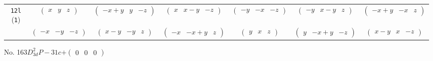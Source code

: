 \documentclass[fleqn,9pt,landscape]{jsarticle}
\begin{document}
\begin{center}
\begin{longtable}{ccccccc}
{\tt 12l} ({\tt 1}) & $ \begin{pmatrix} x & y & z \end{pmatrix} $ & $ \begin{pmatrix} - x + y & y & - z \end{pmatrix} $ & $ \begin{pmatrix} x & x - y & - z \end{pmatrix} $ & $ \begin{pmatrix} - y & - x & - z \end{pmatrix} $ & $ \begin{pmatrix} - y & x - y & z \end{pmatrix} $ & $ \begin{pmatrix} - x + y & - x & z \end{pmatrix} $ \\
& $ \begin{pmatrix} - x & - y & - z \end{pmatrix} $ & $ \begin{pmatrix} x - y & - y & z \end{pmatrix} $ & $ \begin{pmatrix} - x & - x + y & z \end{pmatrix} $ & $ \begin{pmatrix} y & x & z \end{pmatrix} $ & $ \begin{pmatrix} y & - x + y & - z \end{pmatrix} $ & $ \begin{pmatrix} x - y & x & - z \end{pmatrix} $ \\
\end{longtable}
\end{center}
\newpage
No. 163\quad$D_{3d}^{2}$\quad$P-31c$\quad[ trigonal ]\quad$+\begin{pmatrix} 0 & 0 & 0 \end{pmatrix}$
\end{document}
